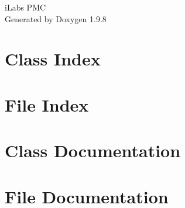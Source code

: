 \documentclass[twoside]{book}
\newcommand{\+}{\discretionary{\mbox{\scriptsize$\hookleftarrow$}}{}{}}
\newcommand{\clearemptydoublepage}{%
    \newpage{\pagestyle{empty}\cleardoublepage}%
  }
\begin{document}
  \raggedbottom
    \hypersetup{pageanchor=false,
                bookmarksnumbered=true,
                pdfencoding=unicode
               }
  \begin{titlepage}
  \vspace*{7cm}
  \begin{center}%
  {\Large i\+Labs PMC}\\
  \vspace*{1cm}
  {\large Generated by Doxygen 1.9.8}\\
  \end{center}
  \end{titlepage}
  \clearemptydoublepage
  \tableofcontents
  \clearemptydoublepage
  \hypersetup{pageanchor=true}
\chapter{Class Index}

\chapter{File Index}

\chapter{Class Documentation}

\chapter{File Documentation}


  \backmatter
  \newpage
  \clearemptydoublepage
  \printindex
\end{document}
